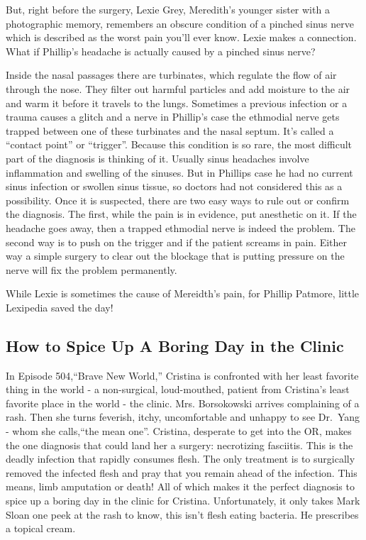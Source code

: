 \documentclass[12pt,a4paper,onecolumn]{article}
\begin{document}
But, right before the surgery, Lexie Grey, Meredith's younger sister with a photographic memory,
remembers an obscure condition of a pinched sinus\cite{sinus} nerve which is described as the worst
pain you'll ever know. Lexie makes a connection. What if Phillip's headache is actually caused by a
pinched sinus nerve?

Inside the nasal\cite{nasal} passages there are turbinates, which regulate the flow of air through
the nose. They filter out harmful particles and add moisture to the air and warm it before it
travels to the lungs. Sometimes a previous infection or a trauma causes a glitch and a nerve in
Phillip's case the ethmodial nerve gets trapped between one of these turbinates and the nasal
septum. It's called a ``contact point'' or ``trigger''. Because this condition is so rare, the most
difficult part of the diagnosis is thinking of it. Usually sinus headaches involve inflammation and
swelling of the sinuses. But in Phillips case he had no current sinus infection or swollen sinus
tissue, so doctors had not considered this as a possibility. Once it is suspected, there are two
easy ways to rule out or confirm the diagnosis. The first, while the pain is in evidence, put
anesthetic\cite{anesthetic} on it. If the headache goes away, then a trapped ethmodial nerve is
indeed the problem. The second way is to push on the trigger and if the patient screams in pain.
Either way a simple surgery to clear out the blockage that is putting pressure on the nerve will fix
the problem permanently.

While Lexie is sometimes the cause of Mereidth's pain, for Phillip Patmore, little Lexipedia saved
the day!

\subsection{How to Spice Up A Boring Day in the Clinic}

In Episode 504,``Brave New World,'' Cristina is confronted with her least favorite thing in the
world - a non-surgical, loud-mouthed, patient from Cristina's least favorite place in the world -
the clinic. Mrs. Borsokowski arrives complaining of a rash. Then she turns feverish,
itchy\cite{itchy}, uncomfortable and unhappy to see Dr.~Yang - whom she calls,``the mean one''.
Cristina, desperate to get into the OR, makes the one diagnosis that could land her a surgery:
necrotizing fasciitis. This is the deadly infection that rapidly consumes flesh. The only treatment
is to surgically removed the infected flesh and pray that you remain ahead of the infection. This
means, limb amputation or death! All of which makes it the perfect diagnosis to spice up a boring
day in the clinic for Cristina. Unfortunately, it only takes Mark Sloan one peek at the rash to
know, this isn't flesh eating bacteria. He prescribes a topical cream.
\end{document}
